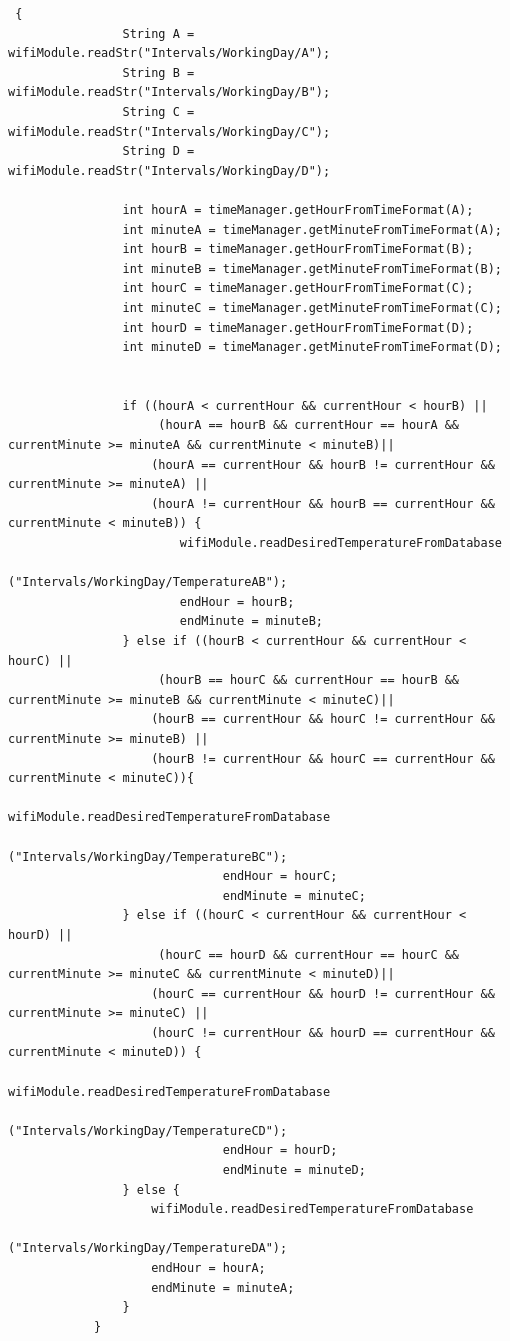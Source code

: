 \vspace{1em}
	
\begin{lstlisting}
 {
                String A = wifiModule.readStr("Intervals/WorkingDay/A");
                String B = wifiModule.readStr("Intervals/WorkingDay/B");
                String C = wifiModule.readStr("Intervals/WorkingDay/C");
                String D = wifiModule.readStr("Intervals/WorkingDay/D");

                int hourA = timeManager.getHourFromTimeFormat(A);
                int minuteA = timeManager.getMinuteFromTimeFormat(A);
                int hourB = timeManager.getHourFromTimeFormat(B);
                int minuteB = timeManager.getMinuteFromTimeFormat(B);
                int hourC = timeManager.getHourFromTimeFormat(C);
                int minuteC = timeManager.getMinuteFromTimeFormat(C);
                int hourD = timeManager.getHourFromTimeFormat(D);
                int minuteD = timeManager.getMinuteFromTimeFormat(D);


                if ((hourA < currentHour && currentHour < hourB) || 
                     (hourA == hourB && currentHour == hourA && currentMinute >= minuteA && currentMinute < minuteB)||
                    (hourA == currentHour && hourB != currentHour && currentMinute >= minuteA) ||
                    (hourA != currentHour && hourB == currentHour && currentMinute < minuteB)) {
                        wifiModule.readDesiredTemperatureFromDatabase
									("Intervals/WorkingDay/TemperatureAB");
                        endHour = hourB;
                        endMinute = minuteB;
                } else if ((hourB < currentHour && currentHour < hourC) || 
                     (hourB == hourC && currentHour == hourB && currentMinute >= minuteB && currentMinute < minuteC)||
                    (hourB == currentHour && hourC != currentHour && currentMinute >= minuteB) ||
                    (hourB != currentHour && hourC == currentHour && currentMinute < minuteC)){
                              wifiModule.readDesiredTemperatureFromDatabase
									("Intervals/WorkingDay/TemperatureBC");
                              endHour = hourC;
                              endMinute = minuteC;
                } else if ((hourC < currentHour && currentHour < hourD) || 
                     (hourC == hourD && currentHour == hourC && currentMinute >= minuteC && currentMinute < minuteD)||
                    (hourC == currentHour && hourD != currentHour && currentMinute >= minuteC) ||
                    (hourC != currentHour && hourD == currentHour && currentMinute < minuteD)) {
                              wifiModule.readDesiredTemperatureFromDatabase
									("Intervals/WorkingDay/TemperatureCD");
                              endHour = hourD;
                              endMinute = minuteD;
                } else {
                    wifiModule.readDesiredTemperatureFromDatabase
									("Intervals/WorkingDay/TemperatureDA");
                    endHour = hourA;
                    endMinute = minuteA;
                }
            }
\end{lstlisting}
\vspace{2em}

